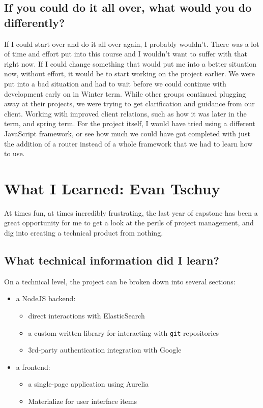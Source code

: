 \documentclass[onecolumn, draftclsnofoot,10pt, compsoc]{IEEEtran}
\begin{document}
\subsection{If you could do it all over, what would you do differently?}
If I could start over and do it all over again, I probably wouldn't. There was a lot of time and effort put into this course and I wouldn't want to suffer with that right now. 
If I could change something that would put me into a better situation now, without effort, it would be to start working on the project earlier. We were put into a bad situation and had to wait before we could continue with development early on in Winter term. 
While other groups continued plugging away at their projects, we were trying to get clarification and guidance from our client. Working with improved client relations, such as how it was later in the term, and spring term. For the project itself, I would have tried using a different JavaScript framework, or see how much we could have got completed with just the addition of a router instead of a whole framework that we had to learn how to use.

\newpage
\section{What I Learned: Evan Tschuy}

At times fun, at times incredibly frustrating, the last year of capstone has been
a great opportunity for me to get a look at the perils of project management, and
dig into creating a technical product from nothing.

\subsection{What technical information did I learn?}

On a technical level, the project can be broken down into several sections:

\begin{itemize}
	\item a NodeJS backend:
	\begin{itemize}
		\item direct interactions with ElasticSearch
		\item a custom-written library for interacting with \verb|git| repositories
		\item 3rd-party authentication integration with Google
	\end{itemize}
	\item a frontend:
	\begin{itemize}
		\item a single-page application using Aurelia
		\item Materialize for user interface items
	\end{itemize}
\end{itemize}
\end{document}
